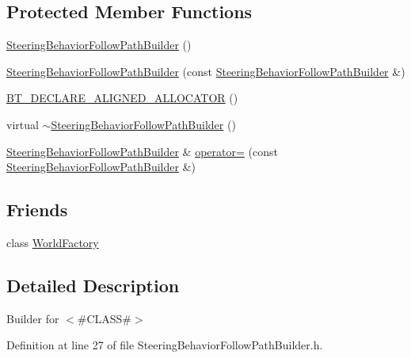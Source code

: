 \subsection*{Protected Member Functions}
\begin{DoxyCompactItemize}
\item 
\mbox{\hyperlink{classnjli_1_1_steering_behavior_follow_path_builder_a0a0391680991754725148fd34e02f3cf}{Steering\+Behavior\+Follow\+Path\+Builder}} ()
\item 
\mbox{\hyperlink{classnjli_1_1_steering_behavior_follow_path_builder_a7062e338770e8a12ed1024186bf93105}{Steering\+Behavior\+Follow\+Path\+Builder}} (const \mbox{\hyperlink{classnjli_1_1_steering_behavior_follow_path_builder}{Steering\+Behavior\+Follow\+Path\+Builder}} \&)
\item 
\mbox{\hyperlink{classnjli_1_1_steering_behavior_follow_path_builder_a65201420f3c7db1fb5c57164d960baae}{B\+T\+\_\+\+D\+E\+C\+L\+A\+R\+E\+\_\+\+A\+L\+I\+G\+N\+E\+D\+\_\+\+A\+L\+L\+O\+C\+A\+T\+OR}} ()
\item 
virtual \mbox{\hyperlink{classnjli_1_1_steering_behavior_follow_path_builder_a320f3724fcc646b892615c8cac29975b}{$\sim$\+Steering\+Behavior\+Follow\+Path\+Builder}} ()
\item 
\mbox{\hyperlink{classnjli_1_1_steering_behavior_follow_path_builder}{Steering\+Behavior\+Follow\+Path\+Builder}} \& \mbox{\hyperlink{classnjli_1_1_steering_behavior_follow_path_builder_a4e2217746bd8711bfa714cea642fab2b}{operator=}} (const \mbox{\hyperlink{classnjli_1_1_steering_behavior_follow_path_builder}{Steering\+Behavior\+Follow\+Path\+Builder}} \&)
\end{DoxyCompactItemize}
\subsection*{Friends}
\begin{DoxyCompactItemize}
\item 
class \mbox{\hyperlink{classnjli_1_1_steering_behavior_follow_path_builder_acb96ebb09abe8f2a37a915a842babfac}{World\+Factory}}
\end{DoxyCompactItemize}


\subsection{Detailed Description}
Builder for $<$\#\+C\+L\+A\+SS\#$>$ 

Definition at line 27 of file Steering\+Behavior\+Follow\+Path\+Builder.\+h.



